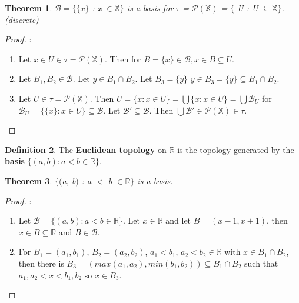 \documentclass{amsart}
\theoremstyle{plain}
\newtheorem{theorem}{Theorem}
\theoremstyle{definition}
\newtheorem{definition}[theorem]{Definition}
\theoremstyle{remark}
\begin{document}
	\begin{theorem}
	$\mathcal{B} = \lbrace\lbrace x \rbrace$ : x $\in \mathbb{X}\rbrace$ is a basis for $\tau$ = $\mathcal{P}(\mathbb{X})$ = $\lbrace$ U : U $\subseteq \mathbb{X} \rbrace$. (discrete)
	\end{theorem}
	\begin{proof}:\newline
		\begin{enumerate}
			\item Let $x \in U \in \tau = \mathcal{P}(\mathbb{X})$. Then for $B = \lbrace x \rbrace \in \mathcal{B}, x \in B \subseteq U$.
			\item Let $B_1, B_2 \in \mathcal{B}$. Let $y \in B_1 \cap B_2$. Let $B_3 = \lbrace y \rbrace$ $y \in B_3 = \lbrace y \rbrace \subseteq B_1 \cap B_2$. 
			\item Let $U \in \tau = \mathcal{P} ( \mathbb{X} )$. Then $U = \lbrace x : x \in U \rbrace = \bigcup \lbrace x : x \in U \rbrace = \bigcup \mathcal{B}_U$ for $\mathcal{B}_U = \lbrace \lbrace x \rbrace : x \in U \rbrace \subseteq \mathcal{B}$.
			\newline Let $\mathcal{B'} \subseteq \mathcal{B}$. Then $\bigcup \mathcal{B'} \in \mathcal{P}(\mathbb{X}) \in \tau$.
		\end{enumerate}
	\end{proof}

	\begin{definition}
	The \textbf{Euclidean topology} on $\mathbb{R}$ is the topology generated by the \textbf{basis} \newline $\lbrace(a, b) : a < b \in \mathbb{R}\rbrace$.
	\end{definition}

	\begin{theorem}
	$\lbrace($a, b$)$ : a $<$ b $\in \mathbb{R}\rbrace$ is a basis.
	\end{theorem}
	\begin{proof}:\newline
		\begin{enumerate}
			\item Let $\mathcal{B} = \lbrace (a, b) : a < b \in \mathbb{R} \rbrace$. Let $x \in \mathbb{R}$ and let $B = (x-1, x+1)$, then $x \in B \subseteq \mathbb{R}$ and $B \in \mathcal{B}$.	
			\item For $B_1 = (a_1, b_1)$, $B_2 = (a_2, b_2)$, $a_1<b_1$, $a_2<b_2 \in \mathbb{R}$ with $x \in B_1 \cap B_2$, then there is $B_3 = ( max(a_1, a_2), min(b_1, b_2) ) \subseteq B_1 \cap B_2$ such that $a_1,a_2<x<b_1,b_2$ so $ x \in B_3$.
		\end{enumerate}
	\end{proof}
\end{document}
